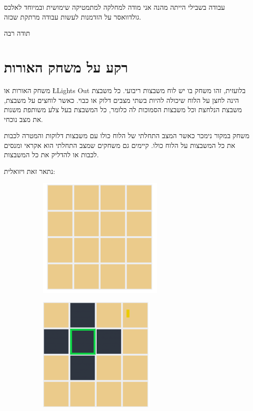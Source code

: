 \documentclass[12pt,twoside]{article}
\begin{document}
עבודה בשבילי הייתה מהנה אני מודה למחלקה 
למתמטיקה שימושית ובמיוחד לאלכס גולדוואסר על הזדמנות לעשות 
עבודה מרתקת שכזה.

תודה רבה

\newpage

\section{רקע על משחק האורות}
משחק האורות או 
\L{Lights Out}
בלועזית,
זהו משחק בו יש לוח משבצות ריבועי.
כל משבצת הינה לחצן על הלוח שיכולה להיות בשתי מצבים
דלוק או כבוי.
כאשר לוחצים על משבצת, משבצת הנלחצת וכל משבצות הסמוכות לה כלומר,
כל המשבצת בעל צלע משותפת משנות את מצב נוכחי.

משחק במקור נימכר כאשר המצב התחלתי של הלוח כולו עם משבצות דלוקות והמטרה לכבות את כל המשבצות על הלוח כולו.
קיימים גם משחקים שמצב התחלתי הוא אקראי ומנסים לכבות או להדליק את כל המשבצות.

נתאר זאת ויזואלית: 

\begin{figure}[ht]
    \begin{subfigure}{.5\textwidth}
        \unsethebrew
        \caption{}
        \centering
        \includegraphics{images/4x4_start_board.PNG}
        \sethebrew
    \end{subfigure}%
    \begin{subfigure}{.5\textwidth}
        \unsethebrew
        \caption{}
        \centering
        \includegraphics{images/4x4_press.PNG}
        \sethebrew
    \end{subfigure}%
\end{figure}
\end{document}
